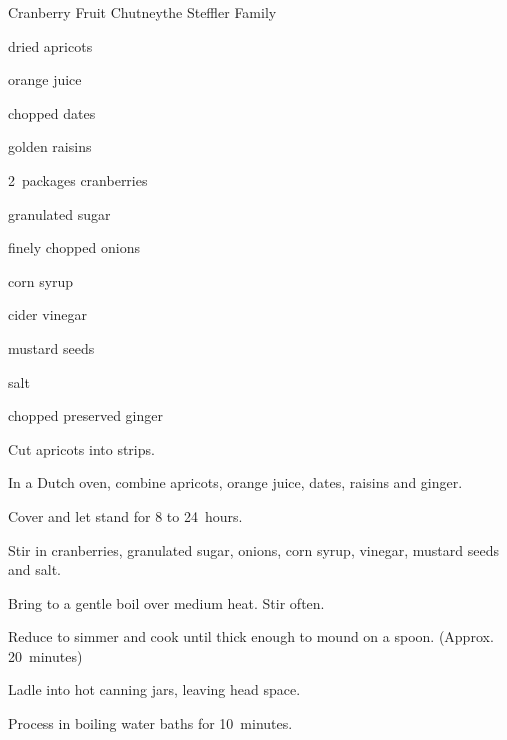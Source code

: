 \begin{recipe}{Cranberry Fruit Chutney}{the Steffler Family}{}

\begin{ingredients}
\item {} dried apricots
\item \C{2\half} orange juice
\item {} chopped dates
\item \C{\half} golden raisins
\item 2~packages cranberries
\item \C{1\half} granulated sugar
\item \C{1\quarter} finely chopped onions
\item \C{\threequarter} corn syrup
\item \C{\threequarter} cider vinegar
\item \tp{1\half} mustard seeds
\item \tp{\quarter} salt
\item \C{\half} chopped preserved ginger
\end{ingredients}

\begin{directions}
\item Cut apricots into \cm{\half} strips.
\item In a Dutch oven, combine apricots, orange juice, dates, raisins and ginger.
\item Cover and let stand for 8 to 24~hours.
\item Stir in cranberries, granulated sugar, onions, corn syrup, vinegar, mustard seeds and salt.
\item Bring to a gentle boil over medium heat. Stir often.
\item Reduce to simmer and cook until thick enough to mound on a spoon. (Approx. 20~minutes)
\item Ladle into  hot canning jars, leaving \cm{\half} head space.
\item Process in boiling water baths for 10~minutes.
\end{directions}
\end{recipe}
